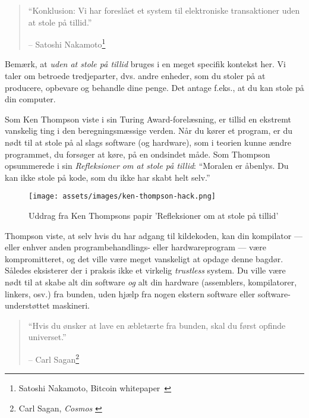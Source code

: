 \begin{quotation}\begin{samepage}
\enquote{Konklusion: Vi har foreslået et system til elektroniske transaktioner
uden at stole på tillid.}
\begin{flushright} -- Satoshi Nakamoto\footnote{Satoshi Nakamoto, Bitcoin 
  whitepaper~\cite{whitepaper}}
\end{flushright}\end{samepage}\end{quotation}

Bemærk, at \textit{uden at stole på tillid} bruges i en meget specifik kontekst
her. Vi taler om betroede tredjeparter, dvs. andre enheder,
som du stoler på at producere, opbevare og behandle dine penge. Det antage 
f.eks., at du kan stole på din computer.

Som Ken Thompson viste i sin Turing Award-forelæsning, er tillid en
ekstremt vanskelig ting i den beregningsmæssige verden. Når du kører et
program, er du nødt til at stole på al slags software (og hardware), som
i teorien kunne ændre programmet, du forsøger at køre, på en ondsindet
måde. Som Thompson opsummerede i sin \textit{Refleksioner om at stole på 
tillid}:
\enquote{Moralen er åbenlys. Du kan ikke stole på kode, som du ikke har skabt
helt selv.}~\cite{trusting-trust}

\begin{figure}[htbp]
  \centering
  \texttt{[image: assets/images/ken-thompson-hack.png]}
  \caption{Uddrag fra Ken Thompsons papir 'Refleksioner om at stole på tillid'}
  \label{fig:ken-thompson-hack}
\end{figure}

Thompson viste, at selv hvis du har adgang til kildekoden,
kan din kompilator --- eller enhver anden programbehandlings- eller
hardwareprogram --- være kompromitteret, og det ville være
meget vanskeligt at opdage denne bagdør. Således eksisterer der i praksis ikke
et virkelig \textit{trustless} system. Du ville være nødt til at skabe alt 
din software \textit{og} alt din hardware (assemblers, kompilatorer, linkers,
osv.) fra bunden, uden hjælp fra nogen ekstern software eller 
software-understøttet maskineri.

\begin{quotation}\begin{samepage}
\enquote{Hvis du ønsker at lave en æbletærte fra bunden, skal du først opfinde
universet.}
\begin{flushright} -- Carl Sagan\footnote{Carl Sagan, \textit{Cosmos} \cite{cosmos}}
\end{flushright}\end{samepage}\end{quotation}

